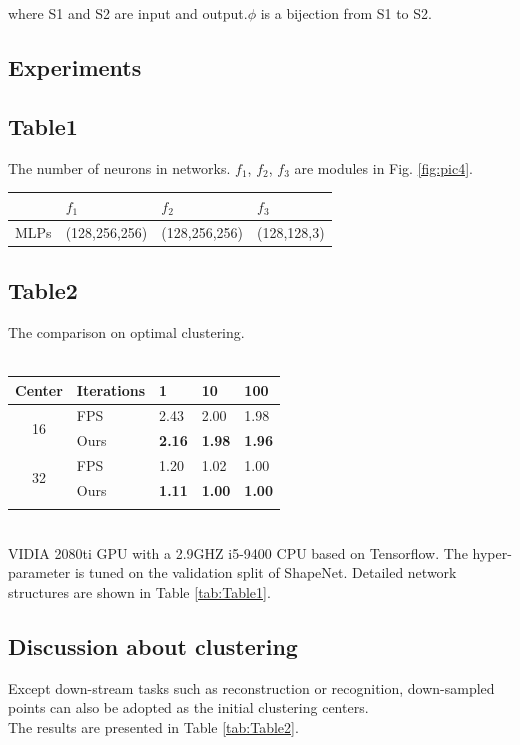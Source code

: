 \documentclass[review]{article}
\begin{document}
where S1 and S2 are input and output.{$\phi$}  is a bijection from S1 to S2.

\newpage

\begin{multicols}{2}




\section{Experiments}
\subsection*{Table1}

The number of neurons in networks. {$f_1$}, {$f_2$}, {$f_3$} are modules in Fig. \ref{fig:pic4}.
\newline
\begin{tabular}{l l l l}
    \hline
    \textbf{ } & $f_1$ & $f_2$ & $f_3$\\ 
    \hline
    MLPs & (128,256,256) & (128,256,256) & (128,128,3)\\
    \hline
\end{tabular}
\label{tab:Table1}




\subsection*{Table2}
The comparison on optimal clustering.\\
\\
\begin{tabular}{cllll}
\hline
Center                                  & Iterations & 1             & 10            & 100           \\
\hline
\multicolumn{1}{c}{\multirow{2}{*}{16}} & FPS        & 2.43          & 2.00          & 1.98          \\
\multicolumn{1}{c}{}                    & Ours       & \textbf{2.16} & \textbf{1.98} & \textbf{1.96} \\
\multirow{2}{*}{32}                     & FPS        & 1.20          & 1.02          & 1.00          \\
                                        & Ours       & \textbf{1.11} & \textbf{1.00} & \textbf{1.00}\\
                                        \hline
\label{tab:Table2}
\end{tabular}

\\
VIDIA
2080ti GPU with a 2.9GHZ i5-9400 CPU based on Tensorflow. The
hyper-parameter  is tuned on the validation split of ShapeNet.
Detailed network structures are shown in Table \ref{tab:Table1}.

\subsection{Discussion about clustering}
Except down-stream tasks such as reconstruction or recognition, down-sampled points can also be adopted as the initial clustering centers. \\
The results are presented in Table \ref{tab:Table2}.
\end{multicols}
\end{document}
